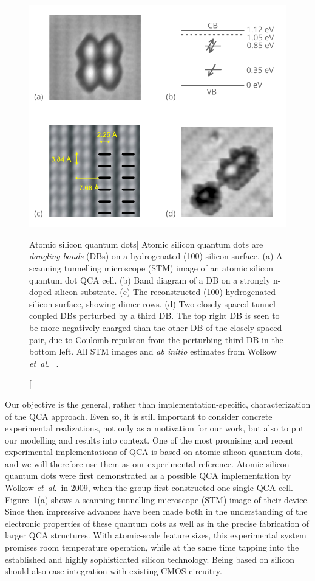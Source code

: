 \begin{figure}
  \center
  \includegraphics{silicon}
  \caption
[Atomic silicon quantum dots]
{
Atomic silicon quantum dots are \emph{dangling bonds} (DBs) on a hydrogenated
(100) silicon surface. (a) A scanning tunnelling microscope (STM) image of an
atomic silicon quantum dot QCA cell. (b) Band diagram of a DB on a strongly
n-doped silicon substrate. (c) The reconstructed (100) hydrogenated silicon
surface, showing dimer rows. (d) Two closely spaced tunnel-coupled DBs perturbed
by a third DB. The top right DB is seen to be more negatively charged than the
other DB of the closely spaced pair, due to Coulomb repulsion from the
perturbing third DB in the bottom left. All STM images and \emph{ab initio}
estimates from Wolkow \emph{et~al}.\ \cite{wolkow2013silicon} \cite{pitters2011tunnel}.
}
  \label{fig:silicon}
\end{figure}

Our objective is the general, rather than implementation-specific,
characterization of the QCA approach. Even so, it is still important to consider
concrete experimental realizations, not only as a motivation for our work, but
also to put our modelling and results into context. One of the most promising
and recent experimental implementations of QCA is based on atomic silicon
quantum dots, and we will therefore use them as our experimental reference.
Atomic silicon quantum dots were first demonstrated as a possible QCA
implementation by Wolkow \emph{et~al}.\ in 2009, when the group first constructed one
single QCA cell. Figure~\ref{fig:silicon}(a) shows a scanning tunnelling
microscope (STM) image of their device. Since then impressive advances have been
made both in the understanding of the electronic properties of these quantum
dots as well as in the precise fabrication of larger QCA structures. With
atomic-scale feature sizes, this experimental system promises room temperature
operation, while at the same time tapping into the established and highly
sophisticated silicon technology. Being based on silicon should also ease
integration with existing CMOS circuitry.

